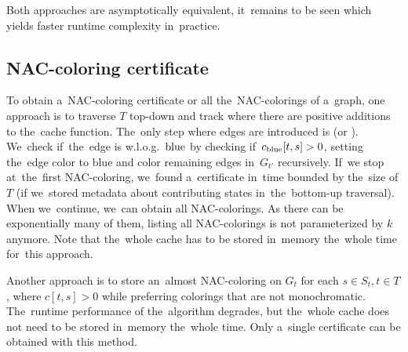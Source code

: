 Both approaches are asymptotically equivalent,
it~remains to be seen which yields faster runtime complexity in~practice.



\subsection{NAC-coloring certificate}

To obtain a~NAC-coloring certificate or all the~NAC-colorings of a~graph,
one approach is to traverse \( T \) top-down
and track where there are positive additions to the~cache function.
%
The~only step where edges are introduced is \IntroduceEdgeNode{}
(or \IntroduceVertexWithEdgesNode{}).
We~check if~the~edge is w.l.o.g.\ \( \text{blue} \) by checking if~\( c_{\text{blue}}[t,s] > 0 \),
setting the~edge color to blue and color remaining edges in~\( G_{t'} \) recursively.
If~we stop at~the~first NAC-coloring, we~found a~certificate in~time bounded by
the~size of \( T \)
(if we~stored metadata about contributing states in~the~bottom-up traversal).
%
When we~continue, we~can obtain all NAC-colorings.
As there can be exponentially many of them,
listing all NAC-colorings is not parameterized by \( k \) anymore.
Note that the~whole cache has to be stored in~memory
the~whole time for~this approach.

Another approach is to store an~almost NAC-coloring on \( G_t \)
for each \( s \in S_t, t \in T \), where \( c[t, s] > 0 \)
while preferring colorings that are not monochromatic.
The~runtime performance of the~algorithm degrades,
but the~whole cache does not need to be stored in~memory the~whole time.
Only a~single certificate can be obtained with this method.


%

